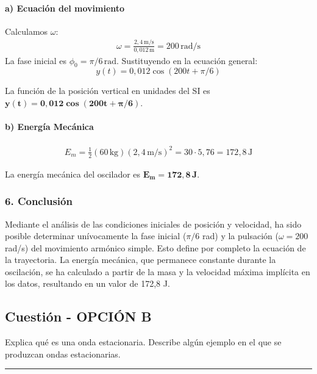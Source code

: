 \paragraph*{a) Ecuación del movimiento}
Calculamos $\omega$:
\begin{gather}
    \omega = \frac{2,4\,\text{m/s}}{0,012\,\text{m}} = 200\,\text{rad/s}
\end{gather}
La fase inicial es $\phi_0 = \pi/6\,\text{rad}$.
Sustituyendo en la ecuación general:
$$ y(t) = 0,012 \cos(200t + \pi/6) $$
\begin{cajaresultado}
    La función de la posición vertical en unidades del SI es $\boldsymbol{y(t) = 0,012 \cos(200t + \pi/6)}$.
\end{cajaresultado}

\paragraph*{b) Energía Mecánica}
\begin{gather}
    E_m = \frac{1}{2} (60\,\text{kg}) (2,4\,\text{m/s})^2 = 30 \cdot 5,76 = 172,8\,\text{J}
\end{gather}
\begin{cajaresultado}
    La energía mecánica del oscilador es $\boldsymbol{E_m = 172,8\,\textbf{J}}$.
\end{cajaresultado}

\subsubsection*{6. Conclusión}
\begin{cajaconclusion}
Mediante el análisis de las condiciones iniciales de posición y velocidad, ha sido posible determinar unívocamente la fase inicial ($\pi/6$ rad) y la pulsación ($\omega=200$ rad/s) del movimiento armónico simple. Esto define por completo la ecuación de la trayectoria. La energía mecánica, que permanece constante durante la oscilación, se ha calculado a partir de la masa y la velocidad máxima implícita en los datos, resultando en un valor de 172,8 J.
\end{cajaconclusion}

\newpage
\subsection{Cuestión - OPCIÓN B}
\label{subsec:IIB_2012_sep}

\begin{cajaenunciado}
Explica qué es una onda estacionaria. Describe algún ejemplo en el que se produzcan ondas estacionarias.
\end{cajaenunciado}
\hrule


